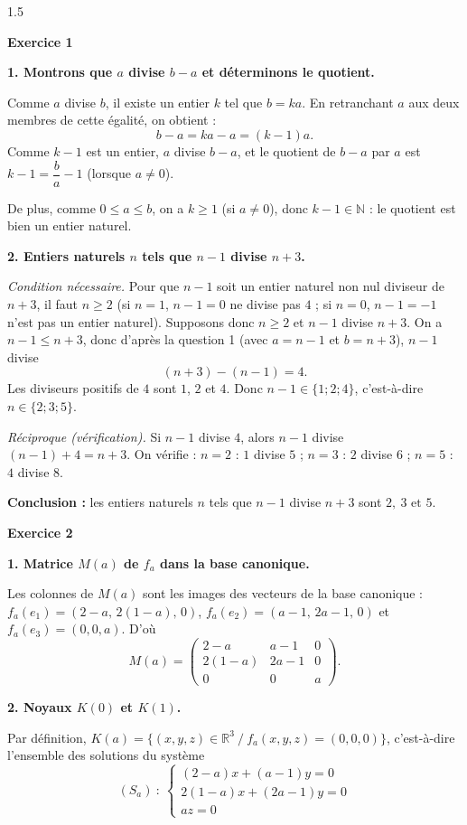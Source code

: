 \documentclass[12pt]{article}
\begin{document}
\begin{spacing}{1.5}

\medskip\textbf{Exercice 1}

\textbf{1. Montrons que $a$ divise $b-a$ et déterminons le quotient.}

Comme $a$ divise $b$, il existe un entier $k$ tel que $b=ka$. En retranchant $a$ aux deux membres de cette égalité, on obtient :
\[
b-a=ka-a=(k-1)a .
\]
Comme $k-1$ est un entier, $a$ divise $b-a$, et le quotient de $b-a$ par $a$ est $k-1=\dfrac{b}{a}-1$ (lorsque $a\neq 0$).

De plus, comme $0\le a\le b$, on a $k\ge 1$ (si $a\neq0$), donc $k-1\in\mathbb{N}$ : le quotient est bien un entier naturel.

\textbf{2. Entiers naturels $n$ tels que $n-1$ divise $n+3$.}

\emph{Condition nécessaire.} Pour que $n-1$ soit un entier naturel non nul diviseur de $n+3$, il faut $n\ge 2$ (si $n=1$, $n-1=0$ ne divise pas $4$ ; si $n=0$, $n-1=-1$ n'est pas un entier naturel).
Supposons donc $n\ge 2$ et $n-1$ divise $n+3$. On a $n-1\le n+3$, donc d'après la question 1 (avec $a=n-1$ et $b=n+3$), $n-1$ divise
\[
(n+3)-(n-1)=4 .
\]
Les diviseurs positifs de $4$ sont $1$, $2$ et $4$. Donc $n-1\in\{1;2;4\}$, c'est-à-dire $n\in\{2;3;5\}$.

\emph{Réciproque (vérification).} Si $n-1$ divise $4$, alors $n-1$ divise $(n-1)+4=n+3$. On vérifie :
$n=2$ : $1$ divise $5$ ; \quad $n=3$ : $2$ divise $6$ ; \quad $n=5$ : $4$ divise $8$.

\textbf{Conclusion :} les entiers naturels $n$ tels que $n-1$ divise $n+3$ sont $\boxed{2,\ 3 \text{ et } 5}$.

\medskip\textbf{Exercice 2}

\textbf{1. Matrice $M(a)$ de $f_a$ dans la base canonique.}

Les colonnes de $M(a)$ sont les images des vecteurs de la base canonique : $f_a(e_1)=(2-a,\,2(1-a),\,0)$, $f_a(e_2)=(a-1,\,2a-1,\,0)$ et $f_a(e_3)=(0,0,a)$. D'où
\[
M(a)=\begin{pmatrix}
2-a & a-1 & 0 \\
2(1-a) & 2a-1 & 0\\
0 & 0 & a
\end{pmatrix}.
\]

\textbf{2. Noyaux $K(0)$ et $K(1)$.}

Par définition, $K(a)=\{(x,y,z)\in\mathbb{R}^3 \ / \ f_a(x,y,z)=(0,0,0)\}$, c'est-à-dire l'ensemble des solutions du système
\[
(S_a)\ :\ \begin{cases}
(2-a)x+(a-1)y=0\\
2(1-a)x+(2a-1)y=0\\
az=0
\end{cases}
\]


\end{spacing}
\end{document}
